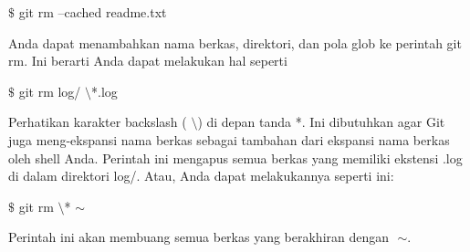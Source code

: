 \noindent 
{\fontsize{14pt}{14pt}\selectfont  $  \$  $ git rm --cached readme.txt \\} \par
\noindent 
{\fontsize{14pt}{14pt}\selectfont Anda dapat menambahkan nama berkas, direktori, dan pola glob ke perintah $  $git rm. Ini berarti Anda dapat melakukan hal seperti \\} \par
\noindent 
{\fontsize{14pt}{14pt}\selectfont  $  \$  $ git rm log/ $  \setminus  $*.log \\} \par
\noindent 
{\fontsize{14pt}{14pt}\selectfont Perhatikan karakter backslash ( $  \setminus  $) di depan tanda $  $*. Ini dibutuhkan agar Git juga meng-ekspansi nama berkas sebagai tambahan dari ekspansi nama berkas oleh shell Anda. Perintah ini mengapus semua berkas yang memiliki ekstensi $  $.log $  $di dalam direktori $  $log/. Atau, Anda dapat melakukannya seperti ini: \\} \par
\noindent 
{\fontsize{14pt}{14pt}\selectfont  $  \$  $ git rm  $  \setminus  $* $  \sim  $ \\} \par
\noindent 
{\fontsize{14pt}{14pt}\selectfont Perintah ini akan membuang semua berkas yang berakhiran dengan $  $ $  \sim  $. \\} \par
\vspace{14pt}
